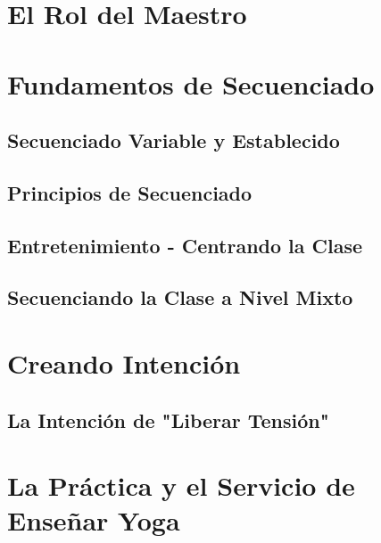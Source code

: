 \section{El Rol del Maestro}
\section{Fundamentos de Secuenciado}
\subsection{Secuenciado Variable y Establecido}
\subsection{Principios de Secuenciado}
\subsection{Entretenimiento - Centrando la Clase}
\subsection{Secuenciando la Clase a Nivel Mixto}
\section{Creando Intención}
\subsection{La Intención de "Liberar Tensión"}
\section{La Práctica y el Servicio de Enseñar Yoga}


